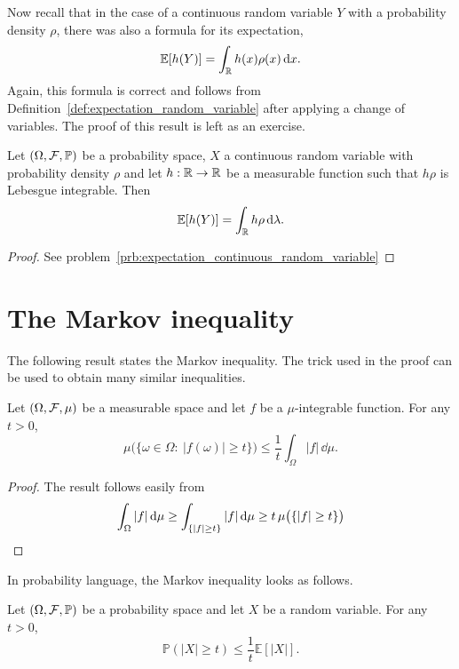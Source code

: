 Now recall that in the case of a continuous random variable $Y$ with a probability density $\rho$, there was also a formula for its expectation,
\[
	\mathbb E[h(Y)] = \int_{\mathbb R} h(x) \rho(x) \, \mathrm{d} x.
\]
Again, this formula is correct and follows from Definition~\ref{def:expectation_random_variable} after applying a change of variables. The proof of this result is left as an exercise.

\begin{lemma}\label{lem:expectation_continuous_random_variable}
Let $(\Omega, \mathcal F, \mathbb{P})$ be a probability space, $X$ a continuous random variable with probability density $\rho$ and let $h : \mathbb R \to \mathbb R$ be a measurable function such that $h \rho$ is Lebesgue integrable. Then
\[
	\mathbb E[h(Y)] = \int_{\mathbb R} h \rho \, \mathrm{d} \lambda.
\]
\end{lemma}

\begin{proof}
See problem~\ref{prb:expectation_continuous_random_variable}
\end{proof}

\section{The Markov inequality}

The following result states the Markov inequality. The trick used in the proof can be used to obtain many similar inequalities.

\begin{lemma}
	Let $(\Omega, \mathcal F, \mu)$ be a measurable space and let $f$ be a $\mu$-integrable function. For any $t>0$,
	\[
	\mu\bigl(\{ \omega \in \Omega : \ |f(\omega)| \geq t \}\bigr) \leq \frac{1}{t} \int_\Omega |f| \,\dd \mu.
	\]
\end{lemma}
\begin{proof} The result follows easily from
	\[
		\int_\Omega |f|\,\mathrm{d} \mu \ge \int_{\{|f|\ge t\}} |f|\,\mathrm{d} \mu \ge t\,\mu\bigl(\{|f|\ge t\}\bigr)  \qedhere
	\]
\end{proof}


In probability language, the Markov inequality looks as follows.

\begin{lemma}
	Let $(\Omega, \mathcal F, \mathbb{P})$ be a probability space and let $X$ be a random variable. For any $t>0$,
	\[
	\mathbb{P}(|X| \geq t) \leq \frac{1}{t} \mathbb{E}[|X|].
	\]
\end{lemma}



